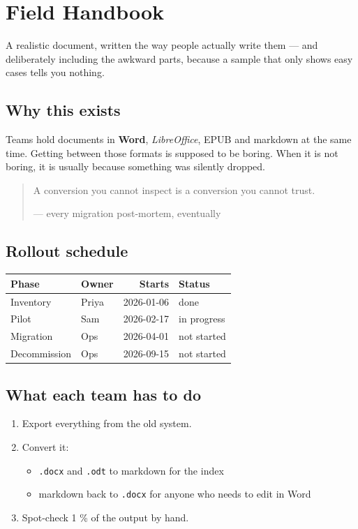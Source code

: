 \documentclass{article}
\providecommand{\tightlist}{%
  \setlength{\itemsep}{0pt}\setlength{\parskip}{0pt}}
\begin{document}
\section{Field Handbook}\label{field-handbook}

A realistic document, written the way people actually write them --- and
deliberately including the awkward parts, because a sample that only shows
easy cases tells you nothing.

\subsection{Why this exists}\label{why-this-exists}

Teams hold documents in \textbf{Word}, \emph{LibreOffice}, EPUB and markdown at the
same time. Getting between those formats is supposed to be boring. When it
is not boring, it is usually because something was silently dropped.

\begin{quote}
A conversion you cannot inspect is a conversion you cannot trust.

--- every migration post-mortem, eventually
\end{quote}

\subsection{Rollout schedule}\label{rollout-schedule}

{\def\LTcaptype{none} %
\begin{longtable}[]{@{}llrl@{}}
\toprule\noalign{}
Phase & Owner & Starts & Status \\
\midrule\noalign{}
\endhead
\bottomrule\noalign{}
\endlastfoot
Inventory & Priya & 2026-01-06 & done \\
Pilot & Sam & 2026-02-17 & in progress \\
Migration & Ops & 2026-04-01 & not started \\
Decommission & Ops & 2026-09-15 & not started \\
\end{longtable}
}

\subsection{What each team has to do}\label{what-each-team-has-to-do}

\begin{enumerate}
\def\labelenumi{\arabic{enumi}.}
\tightlist
\item
  Export everything from the old system.
\item
  Convert it:

  \begin{itemize}
  \tightlist
  \item
    \texttt{.docx} and \texttt{.odt} to markdown for the index
  \item
    markdown back to \texttt{.docx} for anyone who needs to edit in Word
  \end{itemize}
\item
  Spot-check 1 \% of the output by hand.
\end{enumerate}
\end{document}
